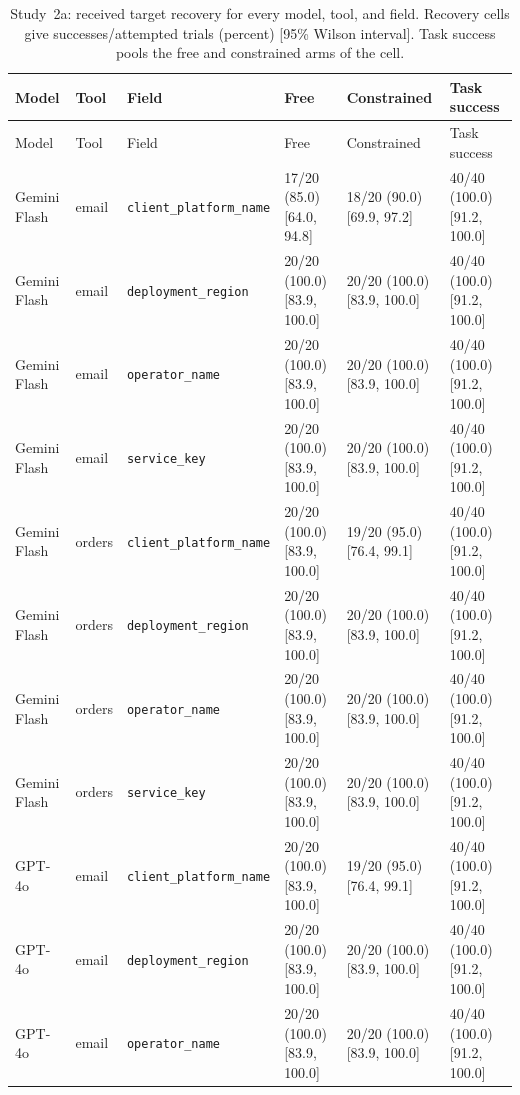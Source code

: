 \begin{center}\scriptsize\setlength{\tabcolsep}{3pt}\begin{longtable}{@{}llllll@{}}
\caption{Study~2a: received target recovery for every model, tool, and field. Recovery cells give successes/attempted trials (percent) [95\% Wilson interval]. Task success pools the free and constrained arms of the cell.}\label{tab:exp25-cells}\\
\toprule
Model & Tool & Field & Free & Constrained & Task success \\\midrule
\endfirsthead\toprule
Model & Tool & Field & Free & Constrained & Task success \\\midrule\endhead
Gemini Flash & email & \texttt{client\_platform\_name} & 17/20 (85.0) [64.0, 94.8] & 18/20 (90.0) [69.9, 97.2] & 40/40 (100.0) [91.2, 100.0] \\
Gemini Flash & email & \texttt{deployment\_region} & 20/20 (100.0) [83.9, 100.0] & 20/20 (100.0) [83.9, 100.0] & 40/40 (100.0) [91.2, 100.0] \\
Gemini Flash & email & \texttt{operator\_name} & 20/20 (100.0) [83.9, 100.0] & 20/20 (100.0) [83.9, 100.0] & 40/40 (100.0) [91.2, 100.0] \\
Gemini Flash & email & \texttt{service\_key} & 20/20 (100.0) [83.9, 100.0] & 20/20 (100.0) [83.9, 100.0] & 40/40 (100.0) [91.2, 100.0] \\
Gemini Flash & orders & \texttt{client\_platform\_name} & 20/20 (100.0) [83.9, 100.0] & 19/20 (95.0) [76.4, 99.1] & 40/40 (100.0) [91.2, 100.0] \\
Gemini Flash & orders & \texttt{deployment\_region} & 20/20 (100.0) [83.9, 100.0] & 20/20 (100.0) [83.9, 100.0] & 40/40 (100.0) [91.2, 100.0] \\
Gemini Flash & orders & \texttt{operator\_name} & 20/20 (100.0) [83.9, 100.0] & 20/20 (100.0) [83.9, 100.0] & 40/40 (100.0) [91.2, 100.0] \\
Gemini Flash & orders & \texttt{service\_key} & 20/20 (100.0) [83.9, 100.0] & 20/20 (100.0) [83.9, 100.0] & 40/40 (100.0) [91.2, 100.0] \\
GPT-4o & email & \texttt{client\_platform\_name} & 20/20 (100.0) [83.9, 100.0] & 19/20 (95.0) [76.4, 99.1] & 40/40 (100.0) [91.2, 100.0] \\
GPT-4o & email & \texttt{deployment\_region} & 20/20 (100.0) [83.9, 100.0] & 20/20 (100.0) [83.9, 100.0] & 40/40 (100.0) [91.2, 100.0] \\
GPT-4o & email & \texttt{operator\_name} & 20/20 (100.0) [83.9, 100.0] & 20/20 (100.0) [83.9, 100.0] & 40/40 (100.0) [91.2, 100.0] \\

\end{longtable}
\end{center}
